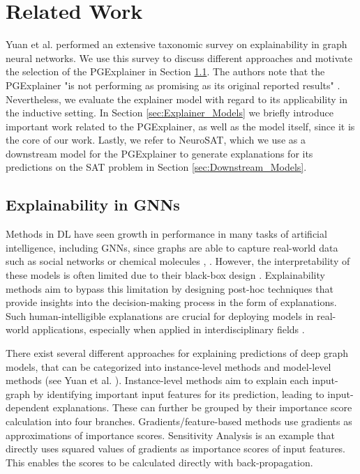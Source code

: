 \chapter{Related Work}

Yuan et al. \cite{yuan2022explainability} performed an extensive taxonomic survey on explainability in graph neural networks. We use this survey to discuss different approaches and motivate the selection of the PGExplainer in Section \ref{sec:gnn_explainability}. The authors note that the PGExplainer "is not performing as promising as its original reported results" \cite{yuan2022explainability}. Nevertheless, we evaluate the explainer model with regard to its applicability in the inductive setting. In Section \ref{sec:Explainer_Models} we briefly introduce important work related to the PGExplainer, as well as the model itself, since it is the core of our work. Lastly, we refer to NeuroSAT, which we use as a downstream model for the PGExplainer to generate explanations for its predictions on the SAT problem in Section \ref{sec:Downstream_Models}.

\section{Explainability in GNNs}
\label{sec:gnn_explainability}

Methods in DL have seen growth in performance in many tasks of artificial intelligence, including GNNs, since graphs are able to capture real-world data such as social networks or chemical molecules \cite{ying2018graph}, \cite{ma2021deep}. However, the interpretability of these models is often limited due to their black-box design \cite{noor2024survey}. Explainability methods aim to bypass this limitation by designing post-hoc techniques that provide insights into the decision-making process in the form of explanations. Such human-intelligible explanations are crucial for deploying models in real-world applications, especially when applied in interdisciplinary fields \cite{ribeiro2016should}.

There exist several different approaches for explaining predictions of deep graph models, that can be categorized into instance-level methods and model-level methods (see Yuan et al.  \cite{yuan2022explainability}). Instance-level methods aim to explain each input-graph by identifying important input features for its prediction, leading to input-dependent explanations. These can further be grouped by their importance score calculation into four branches. Gradients/feature-based methods use gradients as approximations of importance scores. Sensitivity Analysis \cite{baldassarre2019explainability} is an example that directly uses squared values of gradients as importance scores of input features. This enables the scores to be calculated directly with back-propagation.


